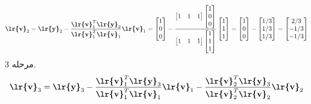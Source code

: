 \documentclass[a4paper,12pt]{report}
\begin{document}
         $$
         \textbf{\lr{v}}_2=\textbf{\lr{y}}_2-
         \frac{\textbf{\lr{v}}_1^T\textbf{\lr{y}}_2}
         {\textbf{\lr{v}}_1^T\textbf{\lr{v}}_1}
         \textbf{\lr{v}}_1=
         \begin{bmatrix}
         	1 \\ 0 \\ 0
         \end{bmatrix}
     	 -
     	 \frac
     	 {
     	 	\begin{bmatrix}
     	 		1 & 1 & 1
     	 	\end{bmatrix}
      		\begin{bmatrix}
      			1 \\ 0 \\ 0
      		\end{bmatrix}
     	 }
     	 {
     	 	\begin{bmatrix}
     	 		1 & 1 & 1
     	 	\end{bmatrix}
     	 	\begin{bmatrix}
     	 		1 \\ 1 \\ 1
     	 	\end{bmatrix}
     	 }
      	 \begin{bmatrix}
      	 	1 \\ 1 \\ 1
      	 \end{bmatrix}
       	 =
       	 \begin{bmatrix}
       	 	1 \\ 0 \\ 0
       	 \end{bmatrix}
         -
       	 \begin{bmatrix}
       	 	1/3 \\ 1/3 \\ 1/3
       	 \end{bmatrix}
         =
         \begin{bmatrix}
         	2/3 \\ -1/3 \\ -1/3
         \end{bmatrix}
         $$
         مرحله 3.
         $$
         \textbf{\lr{v}}_3=\textbf{\lr{y}}_3-
         \frac{\textbf{\lr{v}}_1^T\textbf{\lr{y}}_3}
         {\textbf{\lr{v}}_1^T\textbf{\lr{v}}_1}
         \textbf{\lr{v}}_1-
         \frac{\textbf{\lr{v}}_2^T\textbf{\lr{y}}_3}
         {\textbf{\lr{v}}_2^T\textbf{\lr{v}}_2}
         \textbf{\lr{v}}_2
         $$
\end{document}

